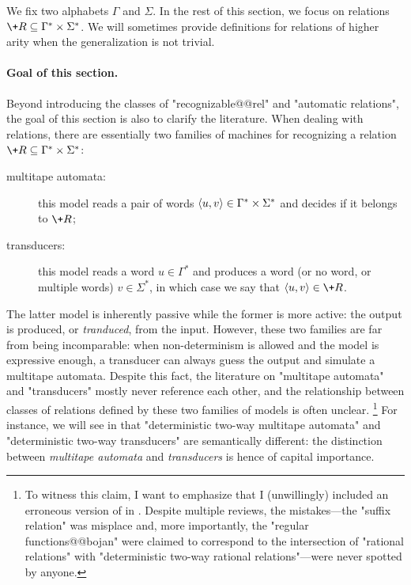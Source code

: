 We fix two alphabets $\Gamma$ and $\Sigma$. In the rest of this section, we focus
on relations $\+R \subseteq \Gamma^* \times \Sigma^*$. We will sometimes provide definitions
for relations of higher arity when the generalization is not trivial.

\paragraph*{Goal of this section.}
Beyond introducing the classes of "recognizable@@rel" and "automatic relations", the goal of
this section is also to clarify the literature. When dealing with relations, there are essentially 
two families of machines for recognizing a relation $\+R \subseteq \Gamma^* \times \Sigma^*$:
\begin{description}
	\item[multitape automata:] this model reads a pair of words $\langle u,v\rangle \in \Gamma^* \times \Sigma^*$ and decides if it belongs to $\+R$;
	\item[transducers:] this model reads a word $u \in \Gamma^*$ and produces a word (or no word, or multiple words) $v\in \Sigma^*$, in which case we say that $\tup{u,v} \in \+R$.  
\end{description}
The latter model is inherently passive while the former is more active: the output is produced,
or \emph{tranduced}, from the input. However, these two families are far from being incomparable:
when non-determinism is allowed and the model is expressive enough, a transducer can always guess the output and simulate a multitape automata. Despite this fact, the literature on "multitape automata" and "transducers" mostly never reference each other, and the relationship between classes
of relations defined by these two families of models is often unclear.%
\footnote{To witness this claim, I want to emphasize that I (unwillingly) included an erroneous 
version of  in \cite{Morvan2025Algebras}.
Despite multiple reviews, the mistakes---the "suffix relation" was misplace and, more
importantly, the "regular functions@@bojan" were claimed to correspond to
the intersection of "rational relations" with "deterministic two-way rational relations"---were never spotted by anyone.}
For instance, we will see in 
that "deterministic two-way multitape automata"
and "deterministic two-way transducers" are semantically different: the distinction
between \emph{multitape automata} and \emph{transducers} is hence of capital importance.

